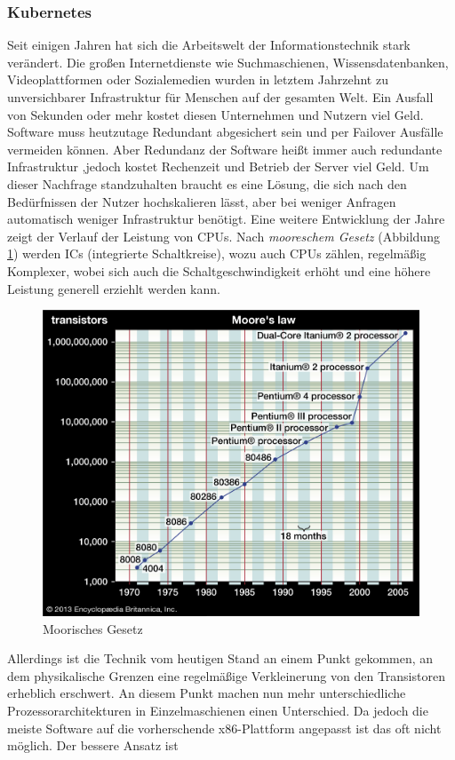 \documentclass[a4paper,11pt]{article}
\begin{document}
      \subsubsection{Kubernetes}
      Seit einigen Jahren hat sich die Arbeitswelt der Informationstechnik stark verändert.
      Die großen Internetdienste wie Suchmaschienen, Wissensdatenbanken, Videoplattformen oder Sozialemedien wurden 
      in letztem Jahrzehnt zu unversichbarer Infrastruktur für Menschen auf der gesamten Welt. Ein Ausfall von Sekunden oder mehr 
      kostet diesen Unternehmen und Nutzern viel Geld. Software muss heutzutage Redundant abgesichert sein und per Failover Ausfälle vermeiden können.
      Aber Redundanz der Software heißt immer auch redundante Infrastruktur ,jedoch kostet Rechenzeit und Betrieb der Server viel Geld. Um dieser 
      Nachfrage standzuhalten braucht es eine Lösung, die sich nach den Bedürfnissen der Nutzer hochskalieren lässt, aber bei weniger Anfragen 
      automatisch weniger Infrastruktur benötigt. Eine weitere Entwicklung der Jahre zeigt der Verlauf der Leistung von CPUs.
      Nach \textit{mooreschem Gesetz} (Abbildung \ref{fig:moores_law}) werden ICs (integrierte Schaltkreise), wozu auch CPUs zählen, regelmäßig Komplexer,
      wobei sich auch die Schaltgeschwindigkeit erhöht und eine höhere Leistung generell erziehlt werden kann.
      \begin{figure}[!ht]
        \includegraphics[width=0.6\linewidth]{assets/gordon-EeMoore-law-number-transistors-computer.jpg}
        \caption{Moorisches Gesetz}
        \label{fig:moores_law}
      \end{figure}
      Allerdings ist die Technik vom heutigen Stand an einem Punkt gekommen, an dem physikalische Grenzen eine regelmäßige Verkleinerung
      von den Transistoren erheblich erschwert. An diesem Punkt machen nun mehr unterschiedliche Prozessorarchitekturen in Einzelmaschienen einen 
      Unterschied. Da jedoch die meiste Software auf die vorherschende x86-Plattform angepasst ist das oft nicht möglich. Der bessere Ansatz ist 
\end{document}
